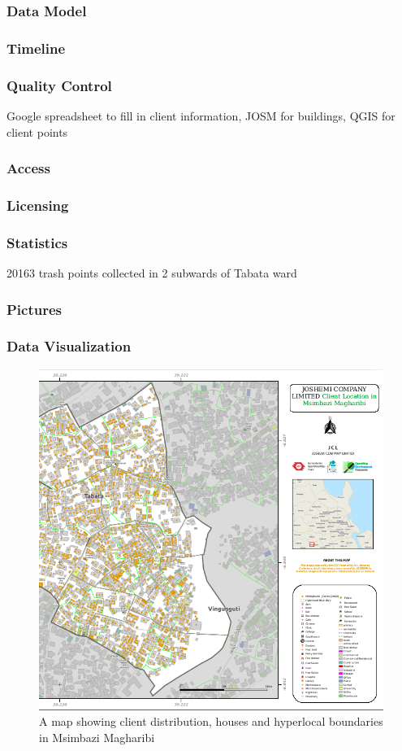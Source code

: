 \documentclass[a4paper,12pt,twoside]{article}
\begin{document}
\subsubsection{Data Model}
\subsubsection{Timeline}
\subsubsection{Quality Control}
Google spreadsheet to fill in client information, JOSM for buildings, QGIS for client points
\subsubsection{Access}
\subsubsection{Licensing}
\subsubsection{Statistics}
20163 trash points collected in 2 subwards of Tabata ward
\subsubsection{Pictures}
\newpage
\subsubsection{Data Visualization}
\begin{figure}[h]
  \color{RHgreen}\caption{A map showing client distribution, houses and hyperlocal boundaries in Msimbazi Magharibi}
  \centering
 \includegraphics[width=0.8 \textwidth]{images/msimbazi_mama_data_viz.png}
\end{figure}
\end{document}
